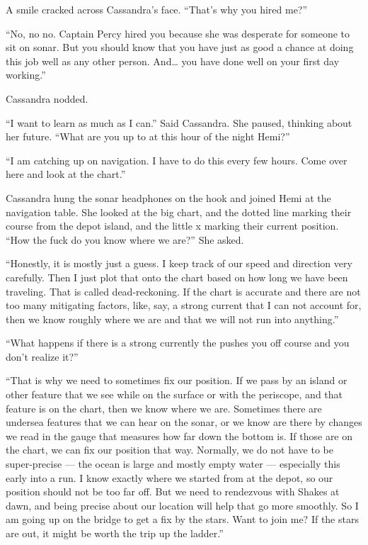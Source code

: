 \documentclass[
]{scrbook}
\begin{document}
A smile cracked across Cassandra's face. ``That's why you hired me?''

``No, no no. Captain Percy hired you because she was desperate for
someone to sit on sonar. But you should know that you have just as good
a chance at doing this job well as any other person. And\ldots{} you
have done well on your first day working.''

Cassandra nodded.

``I want to learn as much as I can.'' Said Cassandra. She paused,
thinking about her future. ``What are you up to at this hour of the
night Hemi?''

``I am catching up on navigation. I have to do this every few hours.
Come over here and look at the chart.''

Cassandra hung the sonar headphones on the hook and joined Hemi at the
navigation table. She looked at the big chart, and the dotted line
marking their course from the depot island, and the little x marking
their current position. ``How the fuck do you know where we are?'' She
asked.

``Honestly, it is mostly just a guess. I keep track of our speed and
direction very carefully. Then I just plot that onto the chart based on
how long we have been traveling. That is called dead-reckoning. If the
chart is accurate and there are not too many mitigating factors, like,
say, a strong current that I can not account for, then we know roughly
where we are and that we will not run into anything.''

``What happens if there is a strong currently the pushes you off course
and you don't realize it?''

``That is why we need to sometimes fix our position. If we pass by an
island or other feature that we see while on the surface or with the
periscope, and that feature is on the chart, then we know where we are.
Sometimes there are undersea features that we can hear on the sonar, or
we know are there by changes we read in the gauge that measures how far
down the bottom is. If those are on the chart, we can fix our position
that way. Normally, we do not have to be super-precise --- the ocean is
large and mostly empty water --- especially this early into a run. I
know exactly where we started from at the depot, so our position should
not be too far off. But we need to rendezvous with Shakes at dawn, and
being precise about our location will help that go more smoothly. So I
am going up on the bridge to get a fix by the stars. Want to join me? If
the stars are out, it might be worth the trip up the ladder.''
\end{document}
